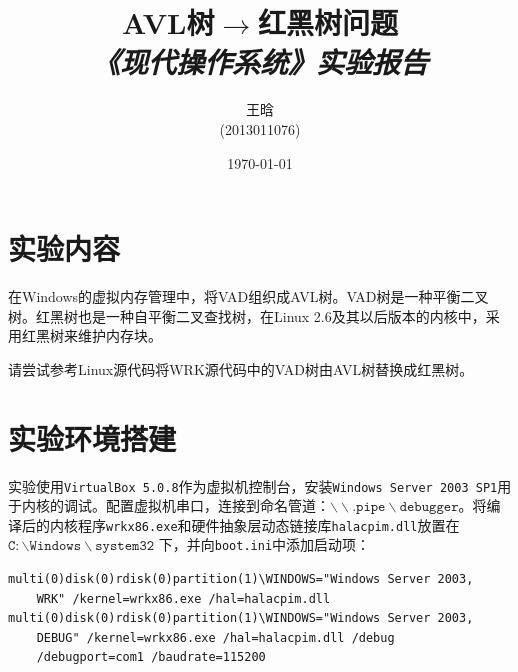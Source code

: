\documentclass[a4paper, 11pt]{article}
\newcommand{\xiaosihao}{\fontsize{12pt}{\baselineskip}\selectfont}
\begin{document}
\newtheorem{example}{例}             %
\newtheorem{algorithm}{算法}
\newtheorem{theorem}{定理}[section]  %
\newtheorem{definition}{定义}
\newtheorem{axiom}{公理}
\newtheorem{property}{性质}
\newtheorem{proposition}{命题}
\newtheorem{lemma}{引理}
\newtheorem{corollary}{推论}
\newtheorem{remark}{注解}
\newtheorem{condition}{条件}
\newtheorem{conclusion}{结论}
\newtheorem{assumption}{假设}
\newtheorem{problem}{问题}
\renewcommand{\contentsname}{目录}  %
\renewcommand{\abstractname}{摘要}  %
\renewcommand{\refname}{参考文献}   %
\renewcommand{\indexname}{索引}
\renewcommand{\figurename}{图}
\renewcommand{\tablename}{表}
\renewcommand{\appendixname}{附录}

    \title{\textbf{AVL树$\rightarrow$红黑树问题}\\\xiaosihao \emph{《现代操作系统》实验报告}}
    \author{王晗\\(2013011076)}
    \date{\today}
    \maketitle

    \section{实验内容}
        在Windows的虚拟内存管理中，将VAD组织成AVL树。VAD树是一种平衡二叉树。红黑树也是一种自平衡二叉查找树，在Linux 2.6及其以后版本的内核中，采用红黑树来维护内存块。

        请尝试参考Linux源代码将WRK源代码中的VAD树由AVL树替换成红黑树。

    \section{实验环境搭建}
        实验使用\texttt{VirtualBox 5.0.8}作为虚拟机控制台，安装\texttt{Windows Server 2003 SP1}用于内核的调试。配置虚拟机串口，连接到命名管道：$\mathtt{\backslash\backslash.pipe\backslash debugger}$。将编译后的内核程序\texttt{wrkx86.exe}和硬件抽象层动态链接库\texttt{halacpim.dll}放置在$\mathtt{C:\backslash Windows\backslash system32}$ 下，并向\texttt{boot.ini}中添加启动项：
\begin{lstlisting}
multi(0)disk(0)rdisk(0)partition(1)\WINDOWS="Windows Server 2003,
    WRK" /kernel=wrkx86.exe /hal=halacpim.dll
multi(0)disk(0)rdisk(0)partition(1)\WINDOWS="Windows Server 2003,
    DEBUG" /kernel=wrkx86.exe /hal=halacpim.dll /debug
    /debugport=com1 /baudrate=115200
\end{lstlisting}
\end{document}
